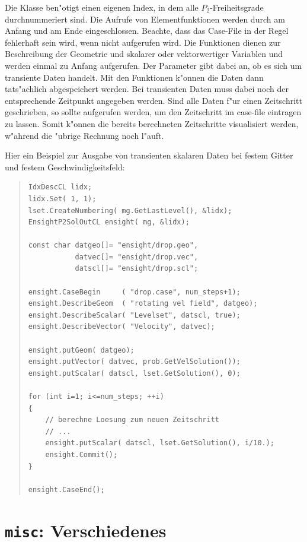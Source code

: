 \documentclass[11pt,a4paper]{article}
\newenvironment{Code}{\begin{quote}\scriptsize}{\end{quote}}
\begin{document}
Die Klasse  ben"otigt einen eigenen Index, in dem alle
$P_2$-Freiheitsgrade durchnummeriert sind. Die Aufrufe von Elementfunktionen
werden durch  am Anfang und  am Ende
eingeschlossen. Beachte, dass das Case-File in der Regel fehlerhaft sein
wird, wenn  nicht aufgerufen wird. Die Funktionen
 dienen zur Beschreibung der Geometrie und skalarer oder
vektorwertiger Variablen und werden einmal zu Anfang aufgerufen. Der Parameter
 gibt dabei an, ob es sich um transiente Daten handelt. Mit den
Funktionen  k"onnen die Daten dann tats"achlich abgespeichert
werden. Bei transienten Daten muss dabei noch der entsprechende Zeitpunkt
angegeben werden. Sind alle Daten f"ur einen Zeitschritt geschrieben, so sollte 
 aufgerufen werden, um den Zeitschritt im case-file eintragen zu lassen. 
Somit k"onnen die bereits berechneten Zeitschritte visualisiert werden, w"ahrend die 
"ubrige Rechnung noch l"auft.

Hier ein Beispiel zur Ausgabe von transienten skalaren Daten bei festem Gitter
und festem Geschwindigkeitsfeld:
\begin{Code}
\begin{verbatim}
IdxDescCL lidx;
lidx.Set( 1, 1);
lset.CreateNumbering( mg.GetLastLevel(), &lidx);
EnsightP2SolOutCL ensight( mg, &lidx);

const char datgeo[]= "ensight/drop.geo", 
           datvec[]= "ensight/drop.vec",
           datscl[]= "ensight/drop.scl";

ensight.CaseBegin     ( "drop.case", num_steps+1);
ensight.DescribeGeom  ( "rotating vel field", datgeo);
ensight.DescribeScalar( "Levelset", datscl, true); 
ensight.DescribeVector( "Velocity", datvec); 

ensight.putGeom( datgeo);
ensight.putVector( datvec, prob.GetVelSolution());
ensight.putScalar( datscl, lset.GetSolution(), 0);

for (int i=1; i<=num_steps; ++i)
{
    // berechne Loesung zum neuen Zeitschritt
    // ...
    ensight.putScalar( datscl, lset.GetSolution(), i/10.);
    ensight.Commit();
}

ensight.CaseEnd();
\end{verbatim}
\end{Code}

\section{{\tt misc}: Verschiedenes}
\end{document}
